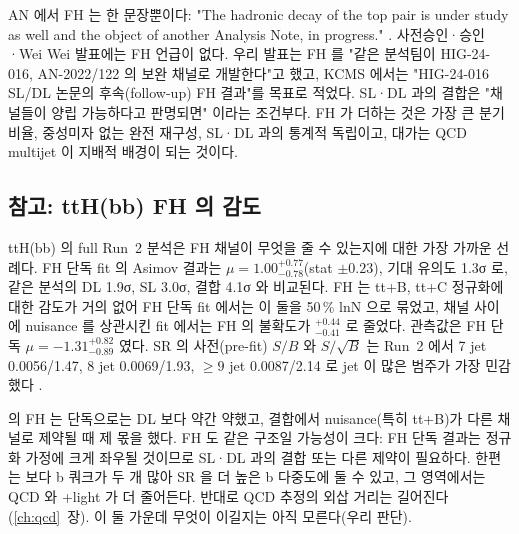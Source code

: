 AN 에서 FH 는 한 문장뿐이다: "The hadronic decay of the top pair is under study as well and the object of another Analysis Note, in progress."
. 사전승인·승인·Wei Wei 발표에는 FH 언급이 없다. 우리 발표는 FH 를 "같은 분석팀이 HIG-24-016,
AN-2022/122 의 보완 채널로 개발한다"고 했고, KCMS 에서는 "HIG-24-016 SL/DL 논문의 후속(follow-up) FH 결과"를 목표로
적었다. SL·DL 과의 결합은 "채널들이 양립 가능하다고 판명되면" 이라는 조건부다. FH 가 더하는 것은 가장
큰 \ttbar 분기 비율, 중성미자 없는 완전 재구성, SL·DL 과의 통계적 독립이고, 대가는 QCD multijet 이 지배적 배경이 되는 것이다.

\subsection{참고: ttH(bb) FH 의 감도}

ttH(bb) 의 full Run~2 분석은 FH 채널이 무엇을 줄 수 있는지에 대한 가장 가까운 선례다. FH 단독 fit 의 Asimov 결과는
$\mu=1.00^{+0.77}_{-0.78}$(stat $\pm0.23$), 기대 유의도 1.3σ 로, 같은 분석의 DL 1.9σ, SL 3.0σ, 결합 4.1σ 와 비교된다.
FH 는 tt+B, tt+C 정규화에 대한 감도가 거의 없어 FH 단독 fit 에서는 이 둘을 50\,\% lnN 으로 묶었고, 채널 사이에 nuisance 를 상관시킨 fit 에서는
FH 의 불확도가 $^{+0.44}_{-0.41}$ 로 줄었다. 관측값은 FH 단독 $\mu=-1.31^{+0.82}_{-0.89}$ 였다.
SR 의 사전(pre-fit) $S/B$ 와 $S/\sqrt{B}$ 는 Run~2 에서 7 jet 0.0056/1.47, 8 jet 0.0069/1.93, $\geq9$ jet 0.0087/2.14 로 jet 이 많은 범주가 가장 민감했다
.

\begin{note}
\ttH 의 FH 는 단독으로는 DL 보다 약간 약했고, 결합에서 nuisance(특히 tt+B)가 다른 채널로 제약될 때 제 몫을 했다. \ttHH FH 도 같은 구조일
가능성이 크다: FH 단독 결과는 \ttbb 정규화 가정에 크게 좌우될 것이므로 SL·DL 과의 결합 또는 다른 제약이 필요하다.
한편 \ttHH 는 \ttH 보다 b 쿼크가 두 개 많아 SR 을 더 높은 b 다중도에 둘 수 있고, 그 영역에서는 QCD 와 \ttbar+light 가 더 줄어든다. 반대로
QCD 추정의 외삽 거리는 길어진다(\ref{ch:qcd}~장). 이 둘 가운데 무엇이 이길지는 아직 모른다(우리 판단).
\end{note}

